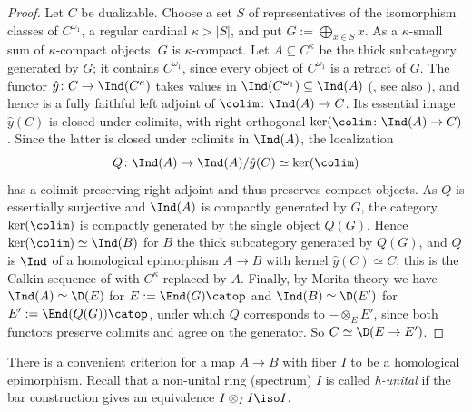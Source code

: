 	\begin{proof}
		Let $C$ be dualizable. Choose a set $S$ of representatives of the isomorphism classes of $C^{\omega_1}$, a regular cardinal $\kappa > |S|$, and put $G := \bigoplus_{x \in S} x$. As a $\kappa$-small sum of $\kappa$-compact objects, $G$ is $\kappa$-compact. Let $A \subseteq C^{\kappa}$ be the thick subcategory generated by $G$; it contains $C^{\omega_1}$, since every object of $C^{\omega_1}$ is a retract of $G$. The functor $\hat{y}\colon C \to \Ind(C^{\kappa})$ takes values in $\Ind(C^{\omega_1}) \subseteq \Ind(A)$ (, see also \cite[Corollary~2.14]{Efimov_Large_Categories}), and hence is a fully faithful left adjoint of $\colim\colon \Ind(A) \to C$. Its essential image $\hat{y}(C)$ is closed under colimits, with right orthogonal $\ker(\colim\colon \Ind(A) \to C)$. Since the latter is closed under colimits in $\Ind(A)$, the localization
		\[
			Q\colon \Ind(A) \to \Ind(A)/\hat{y}(C) \simeq \ker(\colim)
		\]
		has a colimit-preserving right adjoint and thus preserves compact objects. As $Q$ is essentially surjective and $\Ind(A)$ is compactly generated by $G$, the category $\ker(\colim)$ is compactly generated by the single object $Q(G)$. Hence $\ker(\colim) \simeq \Ind(B)$ for $B$ the thick subcategory generated by $Q(G)$, and $Q$ is $\Ind$ of a homological epimorphism $A \to B$ with kernel $\hat{y}(C) \simeq C$; this is the Calkin sequence of  with $C^{\kappa}$ replaced by $A$. Finally, by Morita theory \cite[Theorem~7.1.2.1]{lurie2016HA} we have $\Ind(A) \simeq \D(E)$ for $E := \End(G)\catop$ and $\Ind(B) \simeq \D(E')$ for $E' := \End(Q(G))\catop$, under which $Q$ corresponds to $- \otimes_E E'$, since both functors preserve colimits and agree on the generator. So $C \simeq \D(E \to E')$.
	\end{proof}

	There is a convenient criterion for a map $A \to B$ with fiber $I$ to be a homological epimorphism. Recall that a non-unital ring (spectrum) $I$ is called \emph{h-unital} if the bar construction gives an equivalence $I \otimes_I I \iso I$.

